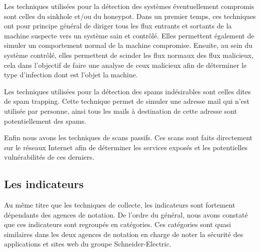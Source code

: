 \documentclass[a4paper,12pt]{book}
\theoremstyle{break}
\begin{document}
Les techniques utilisées pour la détection des systèmes éventuellement compromis sont celles du sinkhole et/ou du honeypot. Dans un premier temps,  ces techniques ont pour principe général de diriger tous les flux entrants et sortants de la machine suspecte vers un système sain et contrôlé. Elles permettent également de simuler un comportement normal de la machine compromise. Ensuite, au sein du système contrôlé, elles permettent de scinder les flux normaux des flux malicieux, cela dans l'objectif de faire une analyse de ceux malicieux afin de déterminer le type d’infection dont est l'objet la machine.


Les techniques utilisées pour la détection des spams indésirables sont celles dites de spam trapping. Cette technique permet de simuler une adresse mail qui n’est utilisée par personne, ainsi tous les mails à destination de cette adresse sont potentiellement des spams. 

Enfin nous avons les techniques de scans passifs. Ces scans sont faits directement sur le réseaux Internet afin de déterminer les services exposés et les potentielles vulnérabilités de ces derniers.

\subsection{Les indicateurs}
Au même titre que les techniques de collecte, les indicateurs  sont fortement dépendants des agences de notation. De l'ordre du général, nous avons constaté que ces indicateurs sont regroupés en catégories. Ces catégories sont quasi similaires dans les deux agences de notation en charge de noter la sécurité des applications et sites web du groupe Schneider-Electric.
\end{document}
